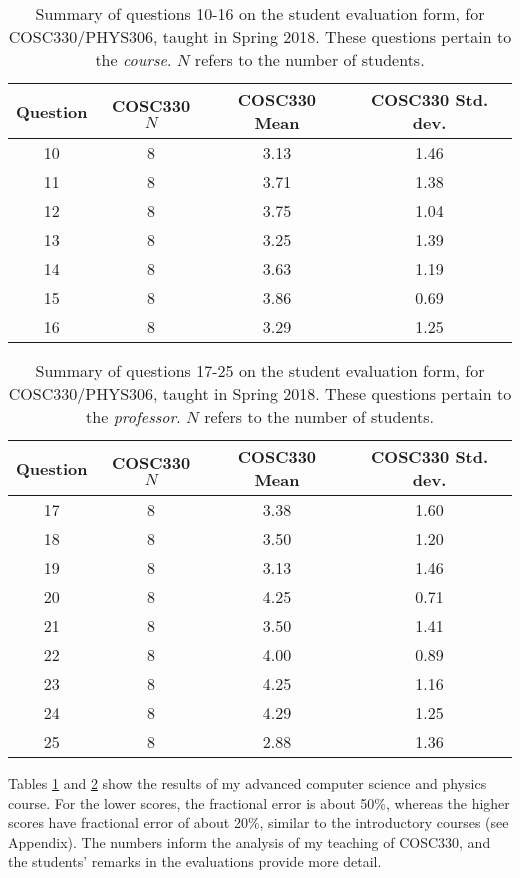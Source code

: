 \documentclass[../../main.tex]{subfiles}
\begin{document}
\begin{table}
\small
\centering
\begin{tabular}{| c | c | c | c |}
\hline \hline
Question & COSC330 $N$ & COSC330 Mean & COSC330 Std. dev. \\ \hline
10 & 8 & 3.13 & 1.46 \\ \hline
11 & 8 & 3.71 & 1.38 \\ \hline
12 & 8 & 3.75 & 1.04 \\ \hline
13 & 8 & 3.25 & 1.39 \\ \hline
14 & 8 & 3.63 & 1.19 \\ \hline
15 & 8 & 3.86 & 0.69 \\ \hline
16 & 8 & 3.29 & 1.25 \\ \hline
\hline
\end{tabular}
\caption{\label{tab:courses:adv_eval_1} Summary of questions 10-16 on the student evaluation form, for COSC330/PHYS306, taught in Spring 2018.  These questions pertain to the \textit{course}. $N$ refers to the number of students.}
\end{table}

\begin{table}
\centering
\begin{tabular}{| c | c | c | c |}
\hline \hline
Question & COSC330 $N$ & COSC330 Mean & COSC330 Std. dev. \\ \hline
17 & 8 & 3.38 & 1.60 \\ \hline
18 & 8 & 3.50 & 1.20 \\ \hline
19 & 8 & 3.13 & 1.46 \\ \hline
20 & 8 & 4.25 & 0.71 \\ \hline
21 & 8 & 3.50 & 1.41 \\ \hline
22 & 8 & 4.00 & 0.89 \\ \hline
23 & 8 & 4.25 & 1.16 \\ \hline
24 & 8 & 4.29 & 1.25 \\ \hline
25 & 8 & 2.88 & 1.36 \\ \hline
\hline
\end{tabular}
\caption{\label{tab:courses:adv_eval_2} Summary of questions 17-25 on the student evaluation form, for COSC330/PHYS306, taught in Spring 2018.  These questions pertain to the \textit{professor}. $N$ refers to the number of students.}
\end{table}

Tables \ref{tab:courses:adv_eval_1} and \ref{tab:courses:adv_eval_2} show the results of my advanced computer science and physics course.  For the lower scores, the fractional error is about 50\%, whereas the higher scores have fractional error of about 20\%, similar to the introductory courses (see Appendix). The numbers inform the analysis of my teaching of COSC330, and the students' remarks in the evaluations provide more detail. \\ \hspace{0.1cm}
\end{document}
